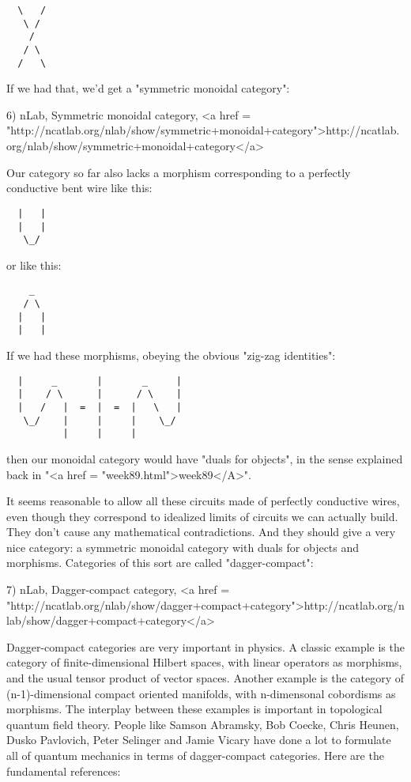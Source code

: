 \begin{verbatim}
  \   /
   \ /
    /
   / \
  /   \
\end{verbatim}
    
If we had that, we'd get a "symmetric monoidal category":

6) nLab, Symmetric monoidal category, 
<a href = "http://ncatlab.org/nlab/show/symmetric+monoidal+category">http://ncatlab.org/nlab/show/symmetric+monoidal+category</a>

Our category so far also lacks a morphism corresponding to a perfectly
conductive bent wire like this:

\begin{verbatim}
  |   |
  |   |
   \_/
\end{verbatim}
    

or like this:

\begin{verbatim}
    _
   / \
  |   |
  |   |
\end{verbatim}
    

If we had these morphisms, obeying the obvious "zig-zag identities":

\begin{verbatim}
  |     _       |       _     |
  |    / \      |      / \    |
  |   /   |  =  |  =  |   \   |
   \_/    |     |     |    \_/
          |     |     |
\end{verbatim}
    
then our monoidal category would have "duals for objects", in the
sense explained back in "<a href = "week89.html">week89</A>".  

It seems reasonable to allow all these circuits made of perfectly
conductive wires, even though they correspond to idealized limits of
circuits we can actually build.  They don't cause any mathematical
contradictions.  And they should give a very nice category: a
symmetric monoidal category with duals for objects and morphisms.
Categories of this sort are called "dagger-compact":

7) nLab, Dagger-compact category, 
<a href = "http://ncatlab.org/nlab/show/dagger+compact+category">http://ncatlab.org/nlab/show/dagger+compact+category</a>

Dagger-compact categories are very important in physics.  A classic
example is the category of finite-dimensional Hilbert spaces, with
linear operators as morphisms, and the usual tensor product of vector
spaces.  Another example is the category of (n-1)-dimensional compact
oriented manifolds, with n-dimensonal cobordisms as morphisms.  The
interplay between these examples is important in topological quantum
field theory.  People like Samson Abramsky, Bob Coecke, Chris Heunen,
Dusko Pavlovich, Peter Selinger and Jamie Vicary have done a lot to
formulate all of quantum mechanics in terms of dagger-compact
categories.  Here are the fundamental references:

